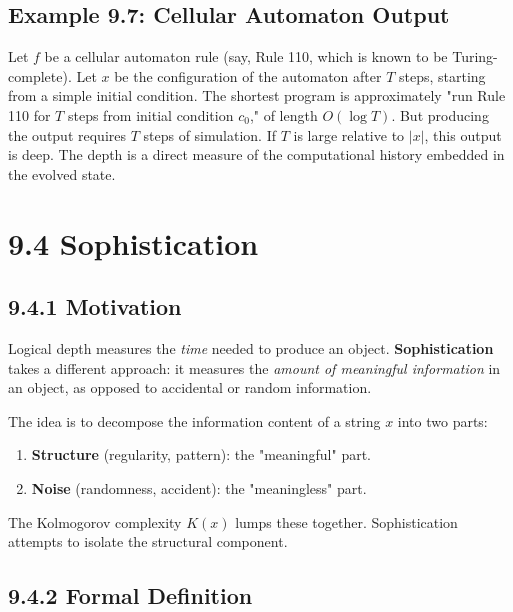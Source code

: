 \subsection{Example 9.7: Cellular Automaton Output}

Let $f$ be a cellular automaton rule (say, Rule 110, which is known to be Turing-complete). Let $x$ be the configuration of the automaton after $T$ steps, starting from a simple initial condition. The shortest program is approximately "run Rule 110 for $T$ steps from initial condition $c_0$," of length $O(\log T)$. But producing the output requires $T$ steps of simulation. If $T$ is large relative to $|x|$, this output is deep. The depth is a direct measure of the computational history embedded in the evolved state.

\section{9.4 Sophistication}

\subsection{9.4.1 Motivation}

Logical depth measures the \textit{time} needed to produce an object. \textbf{Sophistication} takes a different approach: it measures the \textit{amount of meaningful information} in an object, as opposed to accidental or random information.

The idea is to decompose the information content of a string $x$ into two parts:

\begin{enumerate}
  \item \textbf{Structure} (regularity, pattern): the "meaningful" part.
  \item \textbf{Noise} (randomness, accident): the "meaningless" part.
\end{enumerate}

The Kolmogorov complexity $K(x)$ lumps these together. Sophistication attempts to isolate the structural component.

\subsection{9.4.2 Formal Definition}

